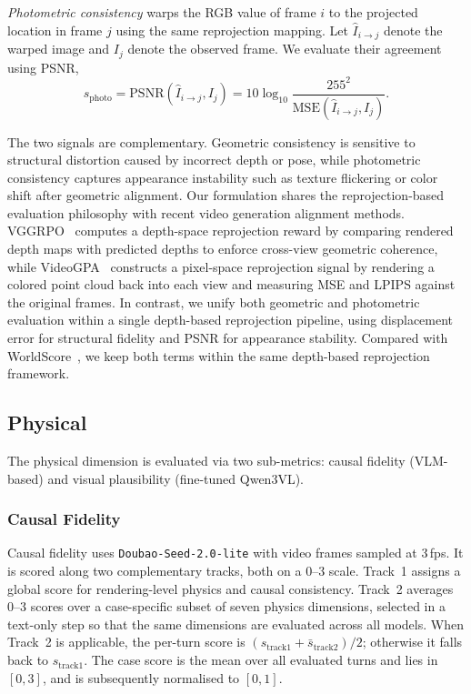 \emph{Photometric consistency} warps the RGB value of frame $i$ to the projected location in frame $j$ using the same reprojection mapping.
Let $\hat{I}_{i \rightarrow j}$ denote the warped image and $I_j$ denote the observed frame.
We evaluate their agreement using PSNR,
\begin{equation}
  s_{\mathrm{photo}} = \mathrm{PSNR}(\hat{I}_{i \rightarrow j}, I_j)
  = 10 \log_{10} \frac{255^2}{\mathrm{MSE}(\hat{I}_{i \rightarrow j}, I_j)}.
\end{equation}

The two signals are complementary.
Geometric consistency is sensitive to structural distortion caused by incorrect depth or pose, while photometric consistency captures appearance instability such as texture flickering or color shift after geometric alignment.
Our formulation shares the reprojection-based evaluation philosophy with recent video generation alignment methods. VGGRPO~\cite{an2026vggrpo} computes a depth-space reprojection reward by comparing rendered depth maps with predicted depths to enforce cross-view geometric coherence, while VideoGPA~\cite{du2026videogpa} constructs a pixel-space reprojection signal by rendering a colored point cloud back into each view and measuring MSE and LPIPS against the original frames. In contrast, we unify both geometric and photometric evaluation within a single depth-based reprojection pipeline, using displacement error for structural fidelity and PSNR for appearance stability.
Compared with WorldScore~\cite{duan2024worldscore}, we keep both terms within the same depth-based reprojection framework.

\subsection{Physical}
\label{app:physical_detail}

The physical dimension is evaluated via two sub-metrics: causal fidelity (VLM-based) and visual plausibility (fine-tuned Qwen3VL).

\subsubsection{Causal Fidelity}
\label{app:causal_fidelity_detail}

Causal fidelity uses \texttt{Doubao-Seed-2.0-lite} with video frames sampled at 3\,fps.
It is scored along two complementary tracks, both on a 0--3 scale. Track~1 assigns a global score for rendering-level physics and causal consistency. Track~2 averages 0--3 scores over a case-specific subset of seven physics dimensions, selected in a text-only step so that the same dimensions are evaluated across all models. When Track~2 is applicable, the per-turn score is $(s_{\text{track1}} + \bar{s}_{\text{track2}})/2$; otherwise it falls back to $s_{\text{track1}}$. The case score is the mean over all evaluated turns and lies in $[0, 3]$, and is subsequently normalised to $[0, 1]$.

